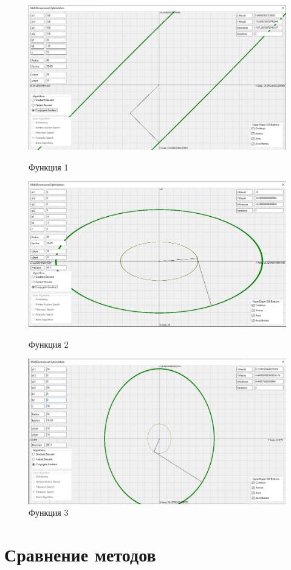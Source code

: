 \documentclass[12pt]{article}
\begin{document}
\begin{figure}[H]
	\centering
	\includegraphics[scale=0.3]{img/1_cd.png}
	\caption{Функция 1}
	\includegraphics[scale=0.3]{img/2_cd.png}
	\caption{Функция 2}
	\includegraphics[scale=0.3]{img/3_cd.png}
	\caption{Функция 3}
\end{figure}

\newpage
\section{Сравнение методов}
\end{document}

